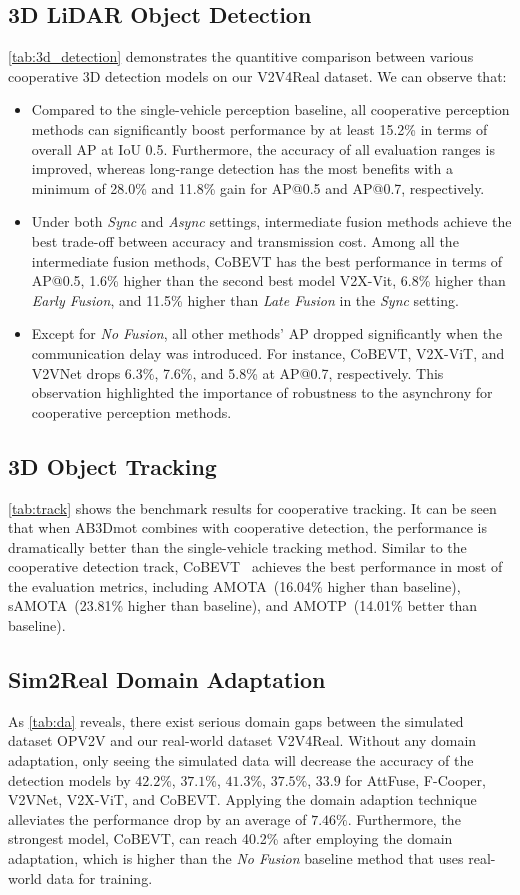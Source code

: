 \documentclass[10pt,twocolumn,letterpaper]{article}
\begin{document}
\subsection{3D LiDAR Object Detection}
\cref{tab:3d_detection} demonstrates the quantitive comparison between various cooperative 3D detection models on our V2V4Real dataset. We can observe that:
\begin{itemize}
     \setlength{\parskip}{0pt}
  \setlength{\itemsep}{0pt plus 0pt}
    \item Compared to the single-vehicle perception baseline, all cooperative perception methods can significantly boost performance by at least 15.2\% in terms of overall AP at IoU 0.5. Furthermore, the accuracy of all evaluation ranges is improved, whereas long-range detection has the most benefits with a minimum of 28.0\% and 11.8\% gain for AP@0.5 and AP@0.7, respectively.
    \item Under both \textit{Sync} and \textit{Async} settings, intermediate fusion methods achieve the best trade-off between accuracy and transmission cost. Among all the intermediate fusion methods, CoBEVT has the best performance in terms of AP@0.5, 1.6\% higher than the second best model V2X-Vit, 6.8\% higher than \textit{Early Fusion}, and 11.5\% higher than \textit{Late Fusion} in the \textit{Sync} setting.
    \item Except for \textit{No Fusion}, all other methods' AP dropped significantly when the communication delay was introduced. For instance, CoBEVT, V2X-ViT, and V2VNet drops 6.3\%, 7.6\%, and 5.8\% at AP@0.7, respectively. This observation highlighted the importance of robustness to the asynchrony for cooperative perception methods.
\end{itemize}
\subsection{3D Object Tracking}
\cref{tab:track} shows the benchmark results for cooperative tracking. It can be seen that  when AB3Dmot combines with cooperative detection, the performance is dramatically better than the single-vehicle tracking method. Similar to the cooperative detection track, CoBEVT~\cite{xu2022cobevt} achieves the best performance in most of the evaluation metrics, including AMOTA~(16.04\% higher than baseline), sAMOTA~(23.81\% higher than baseline), and AMOTP~(14.01\% better than baseline).

\subsection{Sim2Real Domain Adaptation}
As \cref{tab:da} reveals, there exist serious domain gaps between the simulated dataset OPV2V and our real-world dataset V2V4Real. Without any domain adaptation, only seeing the simulated data will decrease the accuracy of the detection models by $42.2\%$, $37.1\%$, $41.3\%$, $37.5\%$, $33.9$ for AttFuse, F-Cooper, V2VNet, V2X-ViT, and CoBEVT. Applying the domain adaption technique alleviates the performance drop by an average of $7.46\%$. Furthermore, the strongest model, CoBEVT, can reach 40.2\% after employing the domain adaptation, which is higher than the \textit{No Fusion} baseline method that uses real-world data for training. 
\end{document}
